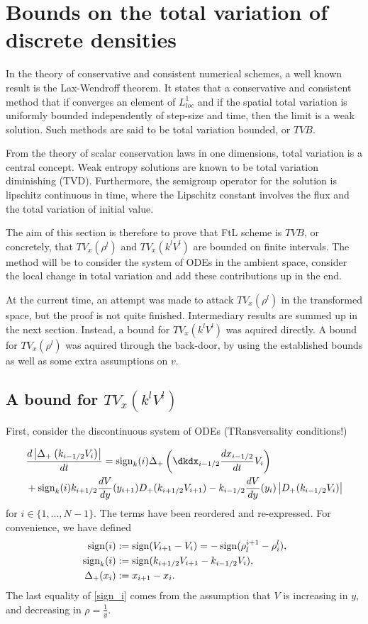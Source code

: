 \section{Bounds on the total variation of discrete densities}

In the theory of conservative and consistent numerical schemes, a well known result is the Lax-Wendroff theorem. It states that a conservative and consistent method that if converges an element of $L^1_{loc}$ and if the spatial total variation is uniformly bounded independently of step-size and time, then the limit is a weak solution. Such methods are said to be total variation bounded, or $TVB$. 

From the theory of scalar conservation laws in one dimensions, total variation is a central concept. Weak entropy solutions are known to be total variation diminishing (TVD). Furthermore, the semigroup operator for the solution is lipschitz continuous in time, where the Lipschitz constant involves the flux and the total variation of initial value.

The aim of this section is therefore to prove that FtL scheme is $TVB$, or concretely, that $TV_x(\rho^l)$ and $TV_x(k^l V^l)$ are bounded on finite intervals. The method will be to consider the system of ODEs in the ambient space, consider the local change in total variation and add these contributions up in the end. 

At the current time, an attempt was made to attack $TV_x(\rho^l)$ in the transformed space, but the proof is not quite finished. Intermediary results are summed up in the next section. Instead, a bound for $TV_x(k^l V^l)$ was aquired directly. A bound for $TV_x(\rho^l)$ was aquired through the back-door, by using the established bounds as well as some extra assumptions on $v$. 


\subsection{A bound for $TV_x(k^lV^l)$}
First, consider the discontinuous system of ODEs  (TRansversality conditions!)

\begin{align} \label{local_TV_kv_deriv}
    &\frac{d \left| \Delta_+\left(k_{i-1/2}V_{i}\right) \right|}{dt}=
     \sgn_k(i) \Delta_+\left(\dkdx_{i-1/2} \frac{dx_{i-1/2}}{dt} V_{i}\right) \nonumber\\
     &+ \sgn_k(i) k_{i+1/2} \frac{dV}{dy}(y_{i+1}) D_+(k_{i+1/2}V_{i+1}) - k_{i-1/2} \frac{dV}{dy}(y_i) \left|D_+(k_{i-1/2}V_{i})\right| \label{Diff_kV_1}
\end{align}
for $i \in \{1,...,N-1\}$. The terms have been reordered and re-expressed. For convenience, we have defined 
\begin{align}
	\operatorname{sign}(i) &:= \operatorname{sign}(V_{i+1} - V_i) = - \operatorname{sign}(\rho_l^{i+1} - \rho^l_i), \label{sign_i}\\
	\operatorname{sign}_k(i) &:= \operatorname{sign}(k_{i+1/2}V_{i+1} - k_{i-1/2}V_i), \\
	\Delta_+(x_i) &:= x_{i+1} - x_{i}. 
\end{align}
The last equality of \eqref{sign_i} comes from the assumption that $V$ is increasing in $y$, and decreasing in $\rho = \frac{1}{y}$.  

